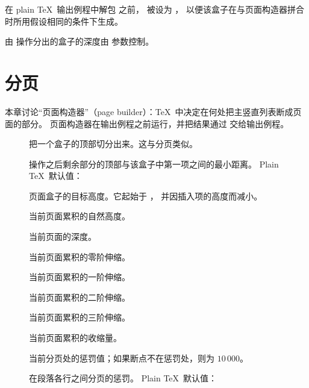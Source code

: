 \documentclass[a4paper]{rapport3}
\newenvironment{inventory}{\begin{description}}{\end{description}}
\begin{document}
在 plain \TeX\ 输出例程中解包  之前，
 被设为 ，
以便该盒子在与页面构造器拼合  时所用假设相同的条件下生成。

由  操作分出的盒子的深度由  参数控制。

\endofchapter
\chapter{分页}\label{page:break}

本章讨论“页面构造器”（page builder）：\TeX\ 中决定在何处把主竖直列表断成页面的部分。
页面构造器在输出例程之前运行，并把结果通过  交给输出例程。

\begin{inventory}
\item []
      把一个盒子的顶部切分出来。这与分页类似。

\item [] 
       操作之后剩余部分的顶部与该盒子中第一项之间的最小距离。
      Plain \TeX\ 默认值：~\n{10pt}

\item [] 
      页面盒子的目标高度。它起始于 ，
      并因插入项的高度而减小。

\item [] 
      当前页面累积的自然高度。

\item [] 
      当前页面的深度。

\item [] 
      当前页面累积的零阶伸缩。

\item [] 
      当前页面累积的一阶伸缩。

\item [] 
      当前页面累积的二阶伸缩。

\item [] 
      当前页面累积的三阶伸缩。

\item [] 
      当前页面累积的收缩量。

\item []   
      当前分页处的惩罚值；如果断点不在惩罚处，则为 $10\,000$。

\item [] 
      在段落各行之间分页的惩罚。
      Plain \TeX\ 默认值：~


\end{inventory}
\end{document}
